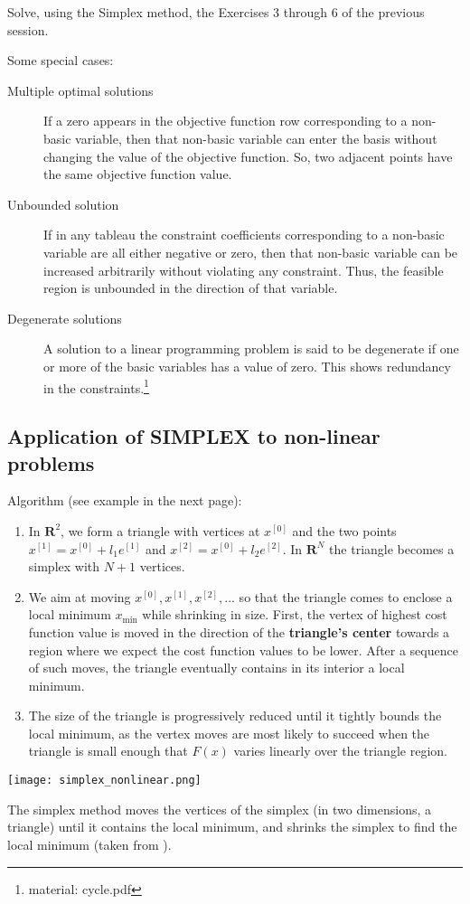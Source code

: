   Solve, using the Simplex method, the Exercises 3 through 6 of the previous session.


    Some special cases:
    \begin{description}
      \item[Multiple optimal solutions] If a zero appears in the objective function row corresponding to a non-basic
      variable, then that non-basic variable can enter the basis without changing the value of
      the objective function. So, two adjacent points have the same objective function value.
      \item[Unbounded solution] If in any tableau the constraint coefficients corresponding to a non-basic variable are all
      either negative or zero, then that non-basic variable can be increased arbitrarily without
      violating any constraint. Thus, the feasible region is unbounded in the direction of that
      variable.
      \item[Degenerate solutions] A solution to a linear programming problem is said to be degenerate if one or more of the
      basic variables has a value of zero. This shows redundancy in the constraints.\footnote{material: cycle.pdf}
    \end{description}

\subsection{Application of SIMPLEX to non-linear problems}


  Algorithm (see example in the next page):
\begin{enumerate}
\item In $\mathbf{R}^2$, we form a triangle with vertices at $x^{[0]}$ and the two points $x^{[1]} = x^{[0]} + l_1e^{[1]}$ and  $x^{[2]} = x^{[0]} + l_2e^{[2]}$. In $\mathbf{R}^N$ the triangle becomes a simplex with $N + 1$ vertices.
\item We aim at moving ${x^{[0]}, x^{[1]}, x^{[2]},...}$ so that the triangle comes to enclose a local minimum $x_{\mathrm{min}}$ while shrinking in size.  First, the vertex of highest cost function value is moved in the direction of the {\bf triangle’s center} towards a region where we expect the cost function values to be lower. After a sequence of such moves, the triangle eventually contains in its interior a local minimum. 
\item The size of the triangle is progressively reduced until it tightly bounds the local minimum, as the vertex moves are most likely to succeed when the triangle is small enough that $F(x)$ varies linearly over the triangle region.
\end{enumerate}

  \begin{center}
    \texttt{[image: simplex\_nonlinear.png]}
  \end{center}
  The simplex method moves the vertices of the simplex (in two dimensions, a triangle) until it contains the local minimum, and shrinks the simplex to find the local minimum (taken from \cite{beers_numerical_2007}).


